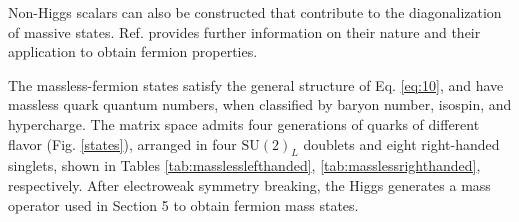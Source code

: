 \documentclass[12pt]{article}
\renewcommand\[{\begin{dmath}}
\renewcommand\]{\end{dmath}}
\begin{document}
 Non-Higgs scalars can also be constructed  that contribute to the diagonalization
of massive states. Ref. \cite{Romero} provides further information on their nature and their application to obtain fermion properties.




 The massless-fermion  states satisfy the general structure
 of Eq. \ref{eq:10},
and have    massless quark quantum numbers, when classified by
baryon number, isospin, and hypercharge. The matrix space admits four
generations of quarks of different flavor (Fig. \ref{states}), arranged in four
$\textrm{SU}(2)_{L}$ doublets and eight right-handed singlets, shown
in Tables \ref{tab:masslesslefthanded}, \ref{tab:masslessrighthanded}, respectively. After electroweak symmetry breaking, the  Higgs   generates a mass operator used in Section 5 to obtain fermion mass states.
\end{document}
